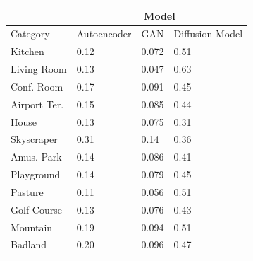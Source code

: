 \documentclass{UoYCSproject}
\begin{document}
\begin{table}[]
    \centering
    \begin{tabular}{|l|lll|}
        \hline
        \multicolumn{1}{|c|}{} & \multicolumn{3}{c|}{Model}                                                                          \\ \hline
        Category               & \multicolumn{1}{c|}{Autoencoder} & \multicolumn{1}{c|}{GAN}  & \multicolumn{1}{c|}{Diffusion Model} \\ \hline
        Kitchen                & \multicolumn{1}{l|}{0.12}        & \multicolumn{1}{l|}{0.072}& 0.51                                    \\ \hline
        Living Room            & \multicolumn{1}{l|}{0.13}        & \multicolumn{1}{l|}{0.047}& 0.63                                    \\ \hline
        Conf. Room             & \multicolumn{1}{l|}{0.17}        & \multicolumn{1}{l|}{0.091}& 0.45                                    \\ \hline
        Airport Ter.           & \multicolumn{1}{l|}{0.15}        & \multicolumn{1}{l|}{0.085}& 0.44                                    \\ \hline
        House                  & \multicolumn{1}{l|}{0.13}        & \multicolumn{1}{l|}{0.075}& 0.31                                    \\ \hline
        Skyscraper             & \multicolumn{1}{l|}{0.31}        & \multicolumn{1}{l|}{0.14 }& 0.36                                    \\ \hline
        Amus. Park             & \multicolumn{1}{l|}{0.14}        & \multicolumn{1}{l|}{0.086}& 0.41                                    \\ \hline
        Playground             & \multicolumn{1}{l|}{0.14}        & \multicolumn{1}{l|}{0.079}& 0.45                                    \\ \hline
        Pasture                & \multicolumn{1}{l|}{0.11}        & \multicolumn{1}{l|}{0.056}& 0.51                                    \\ \hline
        Golf Course            & \multicolumn{1}{l|}{0.13}        & \multicolumn{1}{l|}{0.076}& 0.43                                    \\ \hline
        Mountain               & \multicolumn{1}{l|}{0.19}        & \multicolumn{1}{l|}{0.094}& 0.51                                    \\ \hline
        Badland                & \multicolumn{1}{l|}{0.20}        & \multicolumn{1}{l|}{0.096}& 0.47                                    \\ \hline

\end{tabular}
\end{table}
\end{document}
